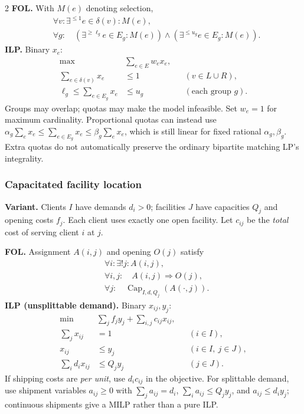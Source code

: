 \documentclass[8pt]{extarticle}
\theoremstyle{definition}
\begin{document}
\begin{multicols*}{2}
\textbf{FOL.} With $M(e)$ denoting selection,
\[
\begin{aligned}
 &\forall v:\exists^{\le1}e\in\delta(v):M(e),\\
 &\forall g:\quad
 (\exists^{\ge\ell_g}e\in E_g:M(e))\land
 (\exists^{\le u_g}e\in E_g:M(e)).
\end{aligned}
\]
\textbf{ILP.} Binary $x_e$:
\[
\begin{aligned}
 \max\quad &\sum_{e\in E}w_ex_e,\\
 \sum_{e\in\delta(v)}x_e&\le1 &&(v\in L\cup R),\\
 \ell_g\le\sum_{e\in E_g}x_e&\le u_g &&(\text{each group }g).
\end{aligned}
\]
Groups may overlap; quotas may make the model infeasible. Set $w_e=1$ for
maximum cardinality. Proportional quotas can instead use
$\alpha_g\sum_ex_e\le\sum_{e\in E_g}x_e\le\beta_g\sum_ex_e$,
which is still linear for fixed rational $\alpha_g,\beta_g$.
Extra quotas do not automatically preserve the ordinary bipartite matching
LP's integrality.

\subsubsection{Capacitated facility location}\label{form:facility}
\textbf{Variant.} Clients $I$ have demands $d_i>0$; facilities $J$ have
capacities $Q_j$ and opening costs $f_j$. Each client uses exactly one open
facility. Let $c_{ij}$ be the \emph{total} cost of serving client $i$ at $j$.

\textbf{FOL.} Assignment $A(i,j)$ and opening $O(j)$ satisfy
\[
\begin{aligned}
 &\forall i:\exists!j:A(i,j),\\
 &\forall i,j:\quad A(i,j)\Rightarrow O(j),\\
 &\forall j:\quad\operatorname{Cap}_{I,d,Q_j}(A(\cdot,j)).
\end{aligned}
\]
\textbf{ILP (unsplittable demand).} Binary $x_{ij},y_j$:
\[
\begin{aligned}
 \min\quad &\sum_jf_jy_j+\sum_{i,j}c_{ij}x_{ij},\\
 \sum_jx_{ij}&=1 &&(i\in I),\\
 x_{ij}&\le y_j &&(i\in I,\ j\in J),\\
 \sum_i d_ix_{ij}&\le Q_jy_j &&(j\in J).
\end{aligned}
\]
If shipping costs are \emph{per unit}, use $d_ic_{ij}$ in the objective.
For splittable demand, use shipment variables $a_{ij}\ge0$ with
$\sum_ja_{ij}=d_i$, $\sum_ia_{ij}\le Q_jy_j$, and $a_{ij}\le d_iy_j$;
continuous shipments give a MILP rather than a pure ILP.


\end{multicols*}
\end{document}
